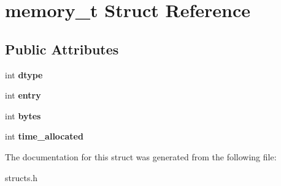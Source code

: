 \hypertarget{structmemory__t}{\section{memory\-\_\-t Struct Reference}
\label{structmemory__t}
}
\subsection*{Public Attributes}
\begin{DoxyCompactItemize}
\item 
\hypertarget{structmemory__t_afe67a9517ec96c3fd688b4e966fab07f}{int {\bfseries dtype}}\label{structmemory__t_afe67a9517ec96c3fd688b4e966fab07f}

\item 
\hypertarget{structmemory__t_a986bfd57925f4a00654d7a18d7dc81c3}{int {\bfseries entry}}\label{structmemory__t_a986bfd57925f4a00654d7a18d7dc81c3}

\item 
\hypertarget{structmemory__t_aa76ff43845139d4f10ab1c42312f9283}{int {\bfseries bytes}}\label{structmemory__t_aa76ff43845139d4f10ab1c42312f9283}

\item 
\hypertarget{structmemory__t_a3e9a0e482bd948492bef419b545d3580}{int {\bfseries time\-\_\-allocated}}\label{structmemory__t_a3e9a0e482bd948492bef419b545d3580}

\end{DoxyCompactItemize}


The documentation for this struct was generated from the following file\-:\begin{DoxyCompactItemize}
\item 
structs.\-h\end{DoxyCompactItemize}
